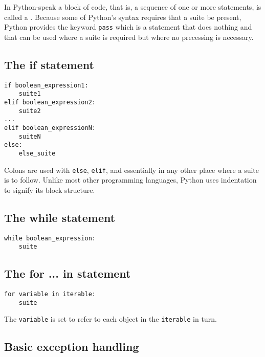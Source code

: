 In Python-speak a block of code, that is, a sequence of one or more statements, is called a .
Because some of Python's syntax requires that a suite be present, Python provides the keyword \verb|pass| which is a statement that does nothing and that can be used where a suite is required but where no precessing is necessary.



\subsection{The if statement}

\begin{tcolorbox}
\begin{verbatim}
if boolean_expression1:
    suite1
elif boolean_expression2:
    suite2
...
elif boolean_expressionN:
    suiteN
else:
    else_suite
\end{verbatim}
\end{tcolorbox}


Colons are used with \verb|else|, \verb|elif|, and essentially in any other place where a suite is to follow.
Unlike most other programming languages, Python uses indentation to signify its block structure.


\subsection{The while statement}

\begin{tcolorbox}
\begin{verbatim}
while boolean_expression:
    suite
\end{verbatim}
\end{tcolorbox}


\subsection{The for ... in statement}

\begin{tcolorbox}
\begin{verbatim}
for variable in iterable:
    suite
\end{verbatim}
\end{tcolorbox}


The \verb|variable| is set to refer to each object in the \verb|iterable| in turn.


\subsection{Basic exception handling}

